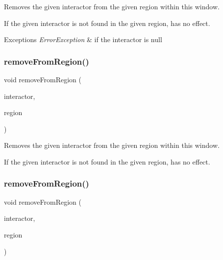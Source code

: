 Removes the given interactor from the given region within this window. 

If the given interactor is not found in the given region, has no effect. 
\begin{DoxyExceptions}{Exceptions}
{\em Error\+Exception} & if the interactor is null \\
\hline
\end{DoxyExceptions}
\mbox{\label{classsgl_1_1GWindow_afee7b65f917c4f6a0fdb1c8ea75406a5}} 
\subsubsection{\texorpdfstring{remove\+From\+Region()}{removeFromRegion()}\hspace{0.1cm}{\footnotesize\ttfamily [3/4]}}
{\footnotesize\ttfamily void remove\+From\+Region (\begin{DoxyParamCaption}\item[{\mbox{\hyperlink{classsgl_1_1GInteractor}{G\+Interactor}} \&}]{interactor,  }\item[{\mbox{\hyperlink{classsgl_1_1GWindow_a81a01a86de31071a92e6cce0bab9bc4b}{Region}}}]{region }\end{DoxyParamCaption})\hspace{0.3cm}{\ttfamily [virtual]}}



Removes the given interactor from the given region within this window. 

If the given interactor is not found in the given region, has no effect. \mbox{\label{classsgl_1_1GWindow_af7a055c83c0e0e3f3722596d7111fcbe}} 
\subsubsection{\texorpdfstring{remove\+From\+Region()}{removeFromRegion()}\hspace{0.1cm}{\footnotesize\ttfamily [4/4]}}
{\footnotesize\ttfamily void remove\+From\+Region (\begin{DoxyParamCaption}\item[{\mbox{\hyperlink{classsgl_1_1GInteractor}{G\+Interactor}} \&}]{interactor,  }\item[{const std\+::string \&}]{region }\end{DoxyParamCaption})\hspace{0.3cm}{\ttfamily [virtual]}}



